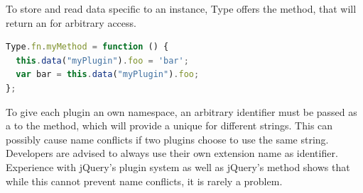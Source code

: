 \noindent To store and read data specific to an instance, Type offers the  method, that will return an  for arbitrary access.

\begin{lstlisting}[language=JavaScript, caption=Example calls to format text, label=lst:format-examples]
Type.fn.myMethod = function () {
  this.data("myPlugin").foo = 'bar';
  var bar = this.data("myPlugin").foo;
};
\end{lstlisting}

\noindent To give each plugin an own namespace, an arbitrary identifier must be passed as a  to the  method, which will provide a unique  for different strings. This can possibly cause name conflicts if two plugins choose to use the same string. Developers are advised to always use their own extension name as identifier. Experience with jQuery's plugin system as well as jQuery's  method shows that while this cannot prevent name conflicts, it is rarely a problem.


